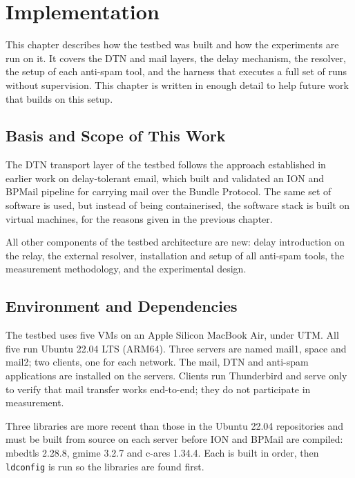 
\chapter{Implementation}

This chapter describes how the testbed was built and how the experiments are run on it. It covers the DTN and mail layers, the delay mechanism, the resolver, the setup of each anti-spam tool, and the harness that executes a full set of runs without supervision. This chapter is written in enough detail to help future work that builds on this setup.

\section{Basis and Scope of This Work}

The DTN transport layer of the testbed follows the approach established in earlier work on delay-tolerant email, which built and validated an ION and BPMail pipeline for carrying mail over the Bundle Protocol. The same set of software is used, but instead of being containerised, the software stack is built on virtual machines, for the reasons given in the previous chapter.

All other components of the testbed architecture are new: delay introduction on the relay, the external resolver, installation and setup of all anti-spam tools, the measurement methodology, and the experimental design.

\section{Environment and Dependencies}

The testbed uses five VMs on an Apple Silicon MacBook Air, under UTM. All five run Ubuntu 22.04 LTS (ARM64). Three servers are named mail1, space and mail2; two clients, one for each network. The mail, DTN and anti-spam applications are installed on the servers. Clients run Thunderbird and serve only to verify that mail transfer works end-to-end; they do not participate in measurement.

Three libraries are more recent than those in the Ubuntu 22.04 repositories and must be built from source on each server before ION and BPMail are compiled: mbedtls 2.28.8, gmime 3.2.7 and c-ares 1.34.4. Each is built in order, then \texttt{ldconfig} is run so the libraries are found first.

